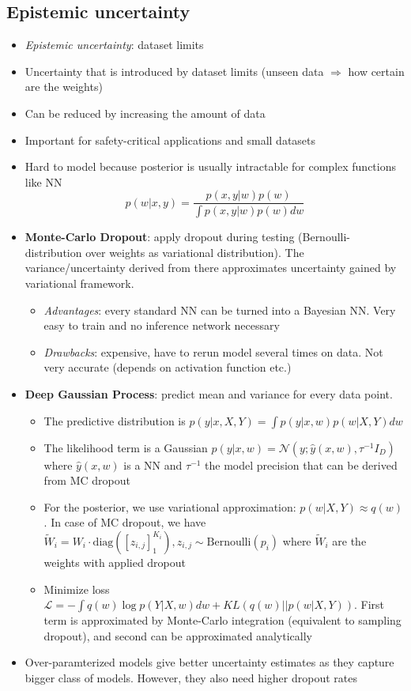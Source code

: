 \subsection{Epistemic uncertainty}
\begin{itemize}
	\item \textit{Epistemic uncertainty}: dataset limits
	\item Uncertainty that is introduced by dataset limits (unseen data $\Rightarrow$ how certain are the weights)
	\item Can be reduced by increasing the amount of data
	\item Important for safety-critical applications and small datasets
	\item Hard to model because posterior is usually intractable for complex functions like NN
	$$p(w|x,y) = \frac{p(x,y|w)p(w)}{\int p(x,y|w)p(w)dw}$$
	\item \textbf{Monte-Carlo Dropout}: apply dropout during testing (Bernoulli-distribution over weights as variational distribution). The variance/uncertainty derived from there approximates uncertainty gained by variational framework. 
	\begin{itemize}
		\item \textit{Advantages}: every standard NN can be turned into a Bayesian NN. Very easy to train and no inference network necessary
		\item \textit{Drawbacks}: expensive, have to rerun model several times on data. Not very accurate (depends on activation function etc.)
	\end{itemize}
	\item \textbf{Deep Gaussian Process}: predict mean and variance for every data point.
	\begin{itemize}
		\item The predictive distribution is $p(y|x,X,Y) = \int p(y|x,w)p(w|X,Y)dw$
		\item The likelihood term is a Gaussian $p(y|x,w)=\mathcal{N}(y; \hat{y}(x,w), \tau^{-1}I_D)$ where $\hat{y}(x,w)$ is a NN and $\tau^{-1}$ the model precision that can be derived from MC dropout
		\item For the posterior, we use variational approximation: $p(w|X,Y)\approx q(w)$. In case of MC dropout, we have $\tilde{W}_i = W_i\cdot \text{diag}\left(\left[z_{i,j}\right]_{1}^{K_i}\right), z_{i,j}\sim \text{Bernoulli}\left(p_i\right)$ where $\tilde{W}_i$ are the weights with applied dropout
		\item Minimize loss $\mathcal{L}= - \int q(w)\log p(Y|X,w)dw + KL\left(q(w)||p(w|X,Y)\right)$. First term is approximated by Monte-Carlo integration (equivalent to sampling dropout), and second can be approximated analytically
	\end{itemize}
	\item Over-paramterized models give better uncertainty estimates as they capture bigger class of models. However, they also need higher dropout rates
\end{itemize}
